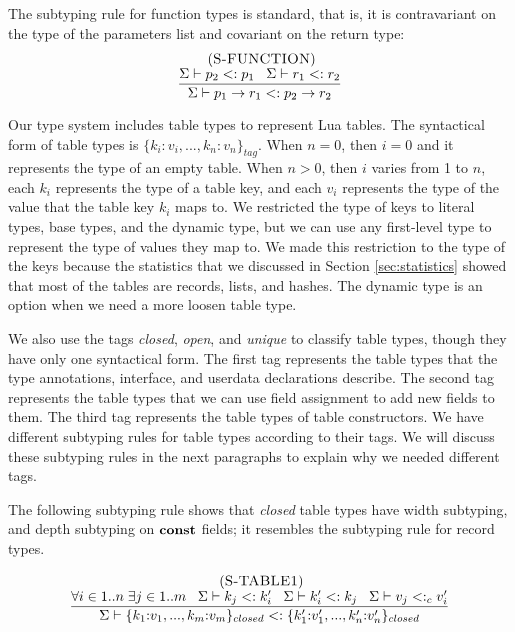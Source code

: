 The subtyping rule for function types is standard, that is, it is
contravariant on the type of the parameters list and
covariant on the return type:
\[
\begin{array}{c}
\; (\textsc{S-FUNCTION})\\
\dfrac{\Sigma \vdash p_{2} <: p_{1} \;\;\;
       \Sigma \vdash r_{1} <: r_{2}}
      {\Sigma \vdash p_{1} \rightarrow r_{1} <: p_{2} \rightarrow r_{2}}
\end{array}
\]

Our type system includes table types to represent Lua tables.
The syntactical form of table types is $\{ k_{i}{:}v_{i}, ..., k_{n}{:}v_{n} \}_{tag}$.
When $n = 0$, then $i = 0$ and it represents the type of an empty table.
When $n > 0$, then $i$ varies from 1 to $n$, each $k_{i}$ represents
the type of a table key, and each $v_{i}$ represents the type of the
value that the table key $k_{i}$ maps to.
We restricted the type of keys to literal types, base types, and the dynamic type,
but we can use any first-level type to represent the type of values they map to.
We made this restriction to the type of the keys because the statistics
that we discussed in Section \ref{sec:statistics} showed that most
of the tables are records, lists, and hashes.
The dynamic type is an option when we need a more loosen table type.

We also use the tags \emph{closed}, \emph{open}, and \emph{unique}
to classify table types, though they have only one syntactical form.
The first tag represents the table types that the type annotations,
interface, and userdata declarations describe.
The second tag represents the table types that we can use field assignment
to add new fields to them.
The third tag represents the table types of table constructors.
We have different subtyping rules for table types according to their
tags.
We will discuss these subtyping rules in the next paragraphs to
explain why we needed different tags.

The following subtyping rule shows that \emph{closed} table types
have width subtyping, and depth subtyping on $\mathbf{const}$ fields;
it resembles the subtyping rule for record types.

\[
\begin{array}{c}
\; (\textsc{S-TABLE1})\\
\dfrac{\forall i \in 1..n \; \exists j \in 1..m \;\;\;
       \Sigma \vdash k_{j} <: k_{i}' \;\;\;
       \Sigma \vdash k_{i}' <: k_{j} \;\;\;
       \Sigma \vdash v_{j} <:_{c} v_{i}'}
      {\Sigma \vdash \{k_{1}{:}v_{1}, ..., k_{m}{:}v_{m}\}_{closed} <: \{k_{1}'{:}v_{1}', ..., k_{n}'{:}v_{n}'\}_{closed}}
\end{array}
\]

